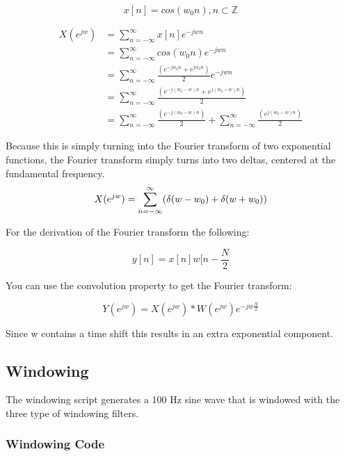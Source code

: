 \documentclass[11pt, a4paper]{article}
\newcommand{\mth}[1]{
  \begin{align*}
    #1
  \end{align*}
}
\begin{document}
\begin{equation}
x[n] = cos(w_0n), n \subset \mathbb{Z}
\end{equation}

\mth{
X(e^{jw}) &= \sum\limits_{n=-\infty}^{\infty} x[n]e^{-jwn}\\
&= \sum\limits_{n=-\infty}^{\infty} cos(w_0n)e^{-jwn}\\
&= \sum\limits_{n=-\infty}^{\infty} \frac{(e^{-jw_0n} + e^{jw_0n})}{2}e^{-jwn} \\
&= \sum\limits_{n=-\infty}^{\infty} \frac{(e^{-j(w_0-w)n} + e^{j(w_0-w)n})}{2} \\
&= \sum\limits_{n=-\infty}^{\infty} \frac{(e^{-j(w_0-w)n})}{2} + \sum\limits_{n=-\infty}^{\infty} \frac{(e^{j(w_0-w)n})}{2}
}

Because this is simply turning into the Fourier transform of two exponential functions, the Fourier transform simply turns into two deltas, centered at the fundamental frequency. \\

\begin{equation}
X(e^{jw}) = \sum\limits_{n=-\infty}^{\infty} (\delta(w-w_0) +\delta(w+w_0))\\
\end{equation}

For the derivation of the Fourier transform the following:

\begin{equation}
y[n] = x[n]w[n-\frac{N}{2}
\end{equation}

You can use the convolution property to get the Fourier transform:

\begin{equation}
Y(e^{jw}) = X(e^{jw})*W(e^{jw})e^{-jw\frac{N}{2}}
\end{equation}

Since w contains a time shift this results in an extra exponential component. \\




\subsection{Windowing}

The windowing script generates a 100 Hz sine wave that is windowed with the three type of windowing filters.

\subsubsection{Windowing Code}
 
\end{document}
